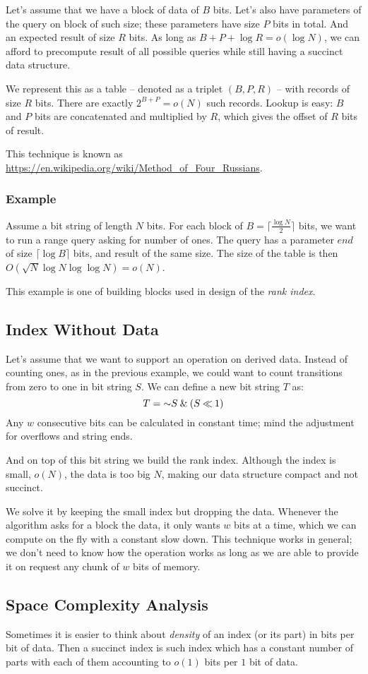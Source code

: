 Let's assume that we have a block of data of $B$ bits.
Let's also have parameters of the query on block of such size; these parameters have size $P$ bits in total.
And an expected result of size $R$ bits.
As long as $B+P+\log R = o(\log N)$, we can afford to precompute result of all possible queries while still having a succinct data structure.

We represent this as a table -- denoted as a triplet $(B, P, R)$ -- with records of size $R$ bits.
There are exactly $2^{B+P} = o(N)$ such records.
Lookup is easy: $B$ and $P$ bits are concatenated and multiplied by $R$, which gives the offset of $R$ bits of result.

This technique is known as \url{https://en.wikipedia.org/wiki/Method_of_Four_Russians}.

\subsubsection{\label{sss:precomputation-example}Example}

Assume a bit string of length $N$ bits.
For each block of $B = \lceil\frac{\log N}{2}\rceil$ bits, we want to run a range query asking for number of ones.
The query has a parameter $end$ of size $\lceil \log {B} \rceil$ bits, and result of the same size.
The size of the table is then $O(\sqrt{N} \log N \log\log N) = o(N)$.

This example is one of building blocks used in design of the \emph{rank index}.

\subsection{\label{ss:index-without-data}Index Without Data}

Let's assume that we want to support an operation on derived data.
Instead of counting ones, as in the previous example, we could want to count transitions from zero to one in bit string $S$.
We can define a new bit string $T$ as:
$$ T = \mathord{\sim} S \mathbin{\&} (S \mathbin{\ll} 1)$$
Any $w$ consecutive bits can be calculated in constant time; mind the adjustment for overflows and string ends.

And on top of this bit string we build the rank index.
Although the index is small, $o(N)$, the data is too big $N$, making our data structure compact and not succinct.

We solve it by keeping the small index but dropping the data.
Whenever the algorithm asks for a block the data, it only wants $w$ bits at a time, which we can compute on the fly with a constant slow down.
This technique works in general; we don't need to know how the operation works as long as we are able to provide it on request any chunk of $w$ bits of memory.

\subsection{Space Complexity Analysis}

Sometimes it is easier to think about \emph{density} of an index (or its part) in bits per bit of data.
Then a succinct index is such index which has a constant number of parts with each of them accounting to $o(1)$ bits per $1$ bit of data.